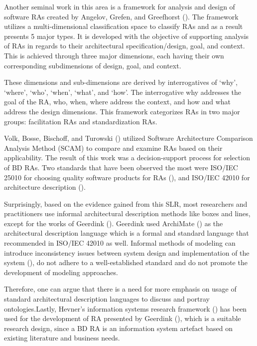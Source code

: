 \documentclass[review]{elsarticle}
\begin{document}
Another seminal work in this area is a framework for analysis and design of software RAs created by Angelov, Grefen, and Greefhorst (\cite{angelov2012framework}). The framework utilizes a multi-dimensional classification space to classify RAs and as a result presents 5 major types. It is developed with the objective of supporting analysis of RAs in regards to their architectural specification/design, goal, and context. This is achieved through three major dimensions, each having their own corresponding subdimensions of design, goal, and context. 

These dimensions and sub-dimensions are derived by interrogatives of ‘why’, ‘where’, ‘who’, ‘when’, ‘what’, and ‘how’. The interrogative why addresses the goal of the RA, who, when, where address the context, and how and what address the design dimensions. This framework categorizes RAs in two major groups: facilitation RAs and standardization RAs.

Volk, Bosse, Bischoff, and Turowski (\cite{volk2019decision}) utilized Software Architecture Comparison Analysis Method (SCAM) to compare and examine RAs based on their applicability. The result of this work was a decision-support process for selection of BD RAs. Two standards that have been observed the most were ISO/IEC 25010 for choosing quality software products for RAs (\cite{Iso}), and ISO/IEC 42010 for architecture description (\cite{ISO42010}). 

Surprisingly, based on the evidence gained from this SLR, most researchers and practitioners use informal architectural description methods like boxes and lines, except for the works of Geerdink (\cite{geerdink2013reference}). Geerdink used ArchiMate (\cite{josey2016introduction}) as the architectural description language which is a formal and standard  language that recommended in ISO/IEC 42010 as well. Informal methods of modeling can introduce inconsistency issues between system design and implementation of the system (\cite{zhu2005software}), do not adhere to a well-established standard and do not promote the development of modeling approaches. 

Therefore, one can argue that there is a need for more emphasis on usage of standard architectural description languages to discuss and portray ontologies.Lastly, Hevner's information systems research framework (\cite{hevner2004design}) has been used for the development of RA presented by Geerdink (\cite{geerdink2013reference}), which is a suitable research design, since a BD RA is an information system artefact based on existing literature and business needs. 
\end{document}
